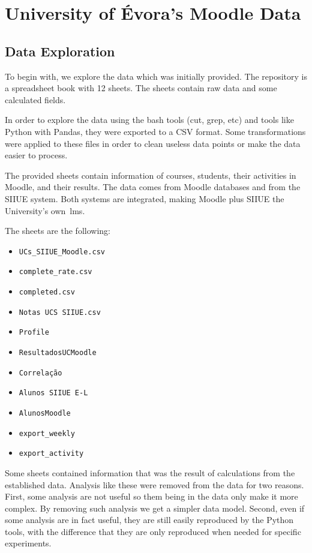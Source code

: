 \chapter{University of Évora's Moodle Data}
\label{sec:data}

\section{Data Exploration}

To begin with, we explore the data which was initially provided. The repository
is a spreadsheet book with 12 sheets. The sheets contain raw data and some
calculated fields.

In order to explore the data using the bash tools (cut, grep, etc) and tools
like Python with Pandas, they were exported to a CSV format. Some
transformations were applied to these files in order to clean useless data
points or make the data easier to process.

The provided sheets contain information of courses, students, their activities
in Moodle, and their results. The data comes from Moodle databases and from the
SIIUE system. Both systems are integrated, making Moodle plus SIIUE the
University's own~\gls{lms}.

The sheets are the following:

\begin{itemize}
    \item \texttt{UCs\_SIIUE\_Moodle.csv}
    \item \texttt{complete\_rate.csv}
    \item \texttt{completed.csv}
    \item \texttt{Notas UCS SIIUE.csv}
    \item \texttt{Profile}
    \item \texttt{ResultadosUCMoodle}
    \item \texttt{Correlação}
    \item \texttt{Alunos SIIUE E-L}
    \item \texttt{AlunosMoodle}
    \item \texttt{export\_weekly}
    \item \texttt{export\_activity}
\end{itemize}

Some sheets contained information that was the result of calculations from the
established data. Analysis like these were removed from the data for two
reasons. First, some analysis are not useful so them being in the data only
make it more complex. By removing such analysis we get a simpler data
model. Second, even if some analysis are in fact useful, they are still easily
reproduced by the Python tools, with the difference that they are only
reproduced when needed for specific experiments.

